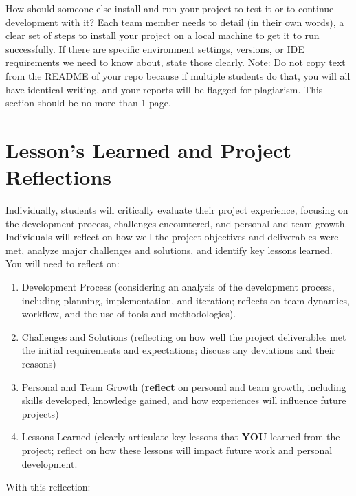 \documentclass[]{article}
\begin{document}
How should someone else install and run your project to test it or to
continue development with it? Each team member needs to detail (in their
own words), a clear set of steps to install your project on a local
machine to get it to run successfully. If there are specific environment
settings, versions, or IDE requirements we need to know about, state
those clearly. Note: Do not copy text from the README of your repo
because if multiple students do that, you will all have identical
writing, and your reports will be flagged for plagiarism. This section
should be no more than 1 page.

\section{Lesson's Learned and Project Reflections}

Individually, students will critically evaluate their project
experience, focusing on the development process, challenges encountered,
and personal and team growth. Individuals will reflect on how well the
project objectives and deliverables were met, analyze major challenges
and solutions, and identify key lessons learned. You will need to
reflect on:

\begin{enumerate}
\def\labelenumi{\roman{enumi}.}
\item
  Development Process (considering an analysis of the development
  process, including planning, implementation, and iteration; reflects
  on team dynamics, workflow, and the use of tools and methodologies).
\item
  Challenges and Solutions (reflecting on how well the project
  deliverables met the initial requirements and expectations; discuss
  any deviations and their reasons)
\item
  Personal and Team Growth (\textbf{reflect} on personal and team
  growth, including skills developed, knowledge gained, and how
  experiences will influence future projects)
\item
  Lessons Learned (clearly articulate key lessons that \textbf{YOU}
  learned from the project; reflect on how these lessons will impact
  future work and personal development.
\end{enumerate}

With this reflection:
\end{document}

